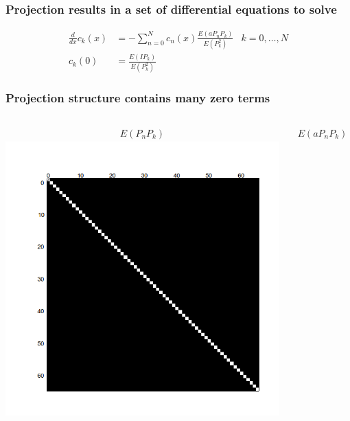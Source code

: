 \documentclass{beamer}
\begin{document}
\begin{frame}
 \frametitle{Projection results in a set of differential equations
 to solve}
 \begin{align*}
     \frac{d}{dx}c_k(x) &= -\sum_{n=0}^N c_n(x) \frac{E(aP_nP_k)}{E(P_k^2)}
     & k=0,\dots,N\\
 c_k(0) &= \frac{E(IP_k)}{E(P_k^2)}
 \end{align*}
 \end{frame}

 
\begin{frame}
 \frametitle{Projection structure contains many zero terms}
 \begin{columns}
\begin{center}
    \begin{align*}
        E(P_nP_k)
    \end{align*}
  \includegraphics[width=\textwidth]{binary_matrix1.png}
\end{center}
     \begin{center}
    \begin{align*}
        E(aP_nP_k)
    \end{align*}

\end{center}
\end{columns}
\end{frame}
\end{document}
